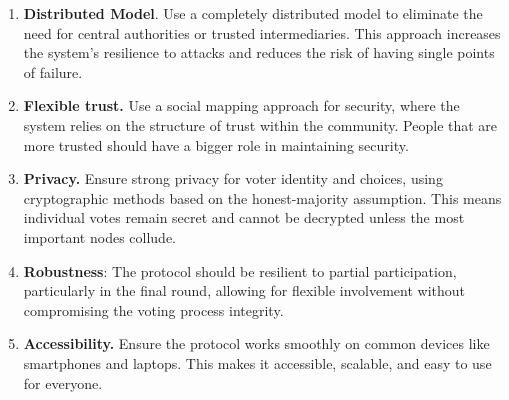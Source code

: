 \documentclass[runningheads]{llncs}
\begin{document}
\begin{enumerate}
    \item \textbf{Distributed Model}. Use a completely distributed model to eliminate the need for central authorities or trusted intermediaries. This approach increases the system's resilience to attacks and reduces the risk of having single points of failure.
    \item \textbf{Flexible trust.} Use a social mapping approach for security, where the system relies on the structure of trust within the community. People that are more trusted should have a bigger role in maintaining security.
    \item \textbf{Privacy.} Ensure strong privacy for voter identity and choices, using cryptographic methods based on the honest-majority assumption. This means individual votes remain secret and cannot be decrypted unless the most important nodes collude.
    \item \textbf{Robustness}: The protocol should be resilient to partial participation, particularly in the final round, allowing for flexible involvement without compromising the voting process integrity.
    \item \textbf{Accessibility.} Ensure the protocol works smoothly on common devices like smartphones and laptops. This makes it accessible, scalable, and easy to use for everyone.
\end{enumerate}


\newcommand{\PartySecretKey}[1]{\ensuremath{s_{#1}}}
\newcommand{\Party}[1]{\ensuremath{P_{#1}}}
\newcommand{\Parties}{\ensuremath{\mathbb{P}}}
\newcommand{\VotesSize}{\ensuremath{|\mathbb{V}}|}

\newcommand{\EncryptionKey}{\textbf{E}}
\newcommand{\DecryptionKey}{\textbf{d}}

\newcommand{\PartialDecryptionKey}[1]{\ensuremath{d_{#1}}}
\newcommand{\PartialEncryptionKey}[1]{\ensuremath{E_{#1}}}

\newcommand{\EncryptedPartialDecryptionKeyShare}[2]{\ensuremath{C_{#1,#2}}}
\newcommand{\SetOfEncryptedPartialDecryptionKeys}{\ensuremath{\mathbb{C}}}
\newcommand{\SetOfFDKG}{\ensuremath{\mathbb{D}}}
\newcommand{\SetOfSharesOfPartialDecryption}{\ensuremath{\mathbb{C}}}
\newcommand{\Voters}{\ensuremath{\mathbb{V}}}
\newcommand{\Tallies}{\ensuremath{\mathbb{T}}}
\newcommand{\IthDecryptionKey}[1]{\ensuremath{d_{#1}}}
\newcommand{\IthEncryptionKey}[1]{E_{#1}}

\newcommand{\DecryptionUsingOf}[2]{\ensuremath{\texttt{Dec}_{#1}(#2)}}
\newcommand{\EncryptionUsingOf}[2]{\ensuremath{\texttt{Enc}_{#1}(#2)}}
\end{document}
